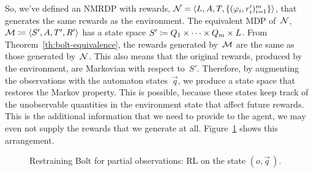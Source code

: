 So, we've defined an NMRDP with \ldl{} rewards, $\mathcal{N} = \langle
L, A, T, \{(\varphi_i, r_i')_{i=1}^m\} \rangle$, that generates
the same rewards as the environment. The equivalent MDP of~$\mathcal{N}$, $\mathcal{M}
\coloneqq \langle S', A, T', R' \rangle$ has a state space $S' \coloneqq Q_1
\times \dots \times Q_m \times L$. From
Theorem~\ref{th:bolt-equivalence}, the rewards generated by~$\mathcal{M}$ are the
same as those generated by~$\mathcal{N}$.  This also means that the original
rewards, produced by the environment, are Markovian with respect to~$S'$.
Therefore, by augmenting the observations with the automaton states~$\vec{q}$,
we produce a state space that restores the Markov property.  This is possible,
because these states keep track of the unobservable quantities in the
environment state that affect future rewards.  This is the additional
information that we need to provide to the agent, we may even not supply the
rewards that we generate at all. Figure~\ref{fig:rb-partial-obs} shows this
arrangement.
\begin{figure}
	\centering
	\caption{Restraining Bolt for partial observations: RL on the state
	$(o, \vec{q}\,)$.}
	\label{fig:rb-partial-obs}
\end{figure}

